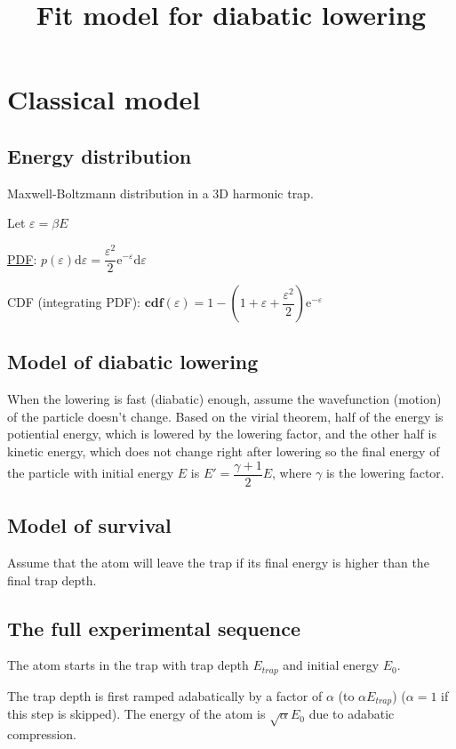 \documentclass[10pt,fleqn]{article}
\title{Fit model for diabatic lowering}
\newcommand{\ud}{\mathrm{d}}
\newcommand{\ue}{\mathrm{e}}
\begin{document}
\section{Classical model}
\subsection{Energy distribution}

Maxwell-Boltzmann distribution in a 3D harmonic trap.

Let $\varepsilon = \beta E$

\href{https://en.wikipedia.org/wiki/Gas_in_a_harmonic_trap#Massive_Maxwell.E2.80.93Boltzmann_particles}{PDF}: $p(\varepsilon)\ud\varepsilon = \dfrac{\varepsilon^2}{2}\ue^{-\varepsilon}\ud\varepsilon$

CDF (integrating PDF): $\mathbf{cdf}(\varepsilon) = 1 - \left(1 + \varepsilon + \dfrac{\varepsilon^2}{2}\right) \ue^{-\varepsilon}$

\subsection{Model of diabatic lowering}

When the lowering is fast (diabatic) enough, assume the wavefunction (motion) of
the particle doesn't change. Based on the virial theorem, half of the energy
is potiential energy, which is lowered by the lowering factor, and the other half
is kinetic energy, which does not change right after lowering so the final energy
of the particle with initial energy $E$ is $E' = \dfrac{\gamma + 1}{2}E$,
where $\gamma$ is the lowering factor.

\subsection{Model of survival}

Assume that the atom will leave the trap if its final energy is higher than
the final trap depth.

\subsection{The full experimental sequence}

The atom starts in the trap with trap depth $E_{trap}$ and initial energy $E_0$.

The trap depth is first ramped adabatically by a factor of $\alpha$
(to $\alpha E_{trap}$) ($\alpha = 1$ if this step is skipped).
The energy of the atom is $\sqrt{\alpha}E_0$ due to adabatic compression.
\end{document}
